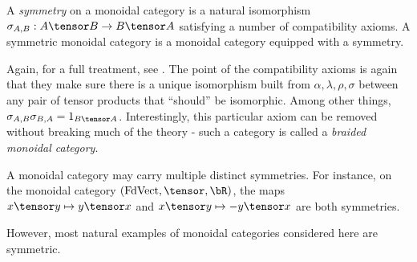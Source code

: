 \documentclass{article}
\DeclareMathOperator{\FdVect}{FdVect}
\begin{document}

\begin{definition}
    A \emph{symmetry} on a monoidal category is a natural isomorphism $\sigma_{A,B}: A \tensor B \to B \tensor A$ satisfying a number of compatibility axioms.
    A symmetric monoidal category is a monoidal category equipped with a symmetry.
\end{definition}
Again, for a full treatment, see \cite{Riehl}.
The point of the compatibility axioms is again that they make sure there is a unique isomorphism built from $\alpha,\lambda,\rho,\sigma$ between any pair of tensor products that ``should'' be isomorphic. Among other things, $\sigma_{A,B}\sigma_{B,A} = 1_{B \tensor A}$.
Interestingly, this particular axiom can be removed without breaking much of the theory - such a category is called a \emph{braided monoidal category}.

\begin{example}
    A monoidal category may carry multiple distinct symmetries.
    For instance, on the monoidal category $(\FdVect, \tensor, \bR)$, the maps $x \tensor y \mapsto y \tensor x$ and $x \tensor y \mapsto -y \tensor x$ are both symmetries. 
\end{example}
However, most natural examples of monoidal categories considered here are symmetric.
\end{document}
